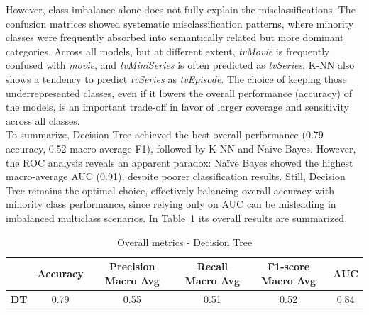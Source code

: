 However, class imbalance alone does not fully explain the misclassifications. The confusion matrices showed systematic misclassification patterns, 
where minority classes were frequently absorbed into semantically related but more dominant categories. 
Across all models, but at different extent, \textit{tvMovie} is frequently confused with \textit{movie}, and \textit{tvMiniSeries} is often predicted as \textit{tvSeries}.
K-NN also shows a tendency to predict \textit{tvSeries} as \textit{tvEpisode}.
The choice of keeping those underrepresented classes, even if it lowers the overall performance (accuracy) of the models, 
is an important trade-off in favor of larger coverage and sensitivity across all classes.\\
To summarize, Decision Tree achieved the best overall performance (0.79 accuracy, 0.52 macro-average F1), followed by K-NN and Naïve Bayes. 
However, the ROC analysis reveals an apparent paradox: Naïve Bayes showed the highest macro-average AUC (0.91), despite poorer classification results.
Still, Decision Tree remains the optimal choice, effectively balancing overall accuracy with minority class performance, 
since relying only on AUC can be misleading in imbalanced multiclass scenarios.
In Table~\ref{tab:best_model_multiclass_classification} its overall results are summarized.
\begin{table}[H]
    \centering
    \begin{tabular}{cccccc}
        \toprule
        \bf{ } & \bf{Accuracy} & \bf{Precision Macro Avg} & \bf{Recall Macro Avg} & \bf{F1-score Macro Avg} & \bf{AUC} \\
        \midrule
        \bf{DT} & 0.79 & 0.55 & 0.51 & 0.52 & 0.84 \\
        \bottomrule
    \end{tabular}
    \caption{Overall metrics - Decision Tree}
    \label{tab:best_model_multiclass_classification}
\end{table}


 






